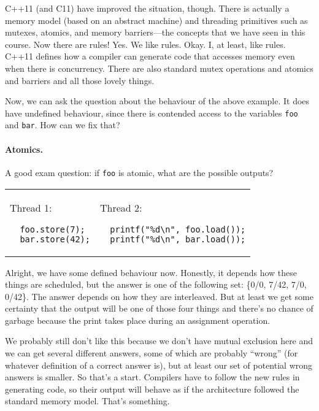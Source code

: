 C++11 (and C11) have improved the situation, though. There is actually
a memory model (based on an abstract machine) and threading primitives
such as mutexes, atomics, and memory barriers---the concepts that we
have seen in this course. Now there are rules! Yes. We like rules. Okay. I, at least, like rules. C++11 defines how a compiler can generate code that accesses memory even when there is concurrency. There are also standard mutex operations and atomics and barriers and all those lovely things.

Now, we can ask the question about the behaviour of the above example.
It does have undefined behaviour, since there is contended access to
the variables {\tt foo} and {\tt bar}. How can we fix that?

\paragraph{Atomics.}
A good exam question: if {\tt foo} is atomic, what are the possible outputs? 
    
    \begin{tabular}{ll}
      \begin{minipage}{.25\textwidth}
        Thread 1:
        \begin{verbatim}
  foo.store(7);
  bar.store(42);
        \end{verbatim}
      \end{minipage} &
      \begin{minipage}{.45\textwidth}
        Thread 2:
        \begin{verbatim}
  printf("%d\n", foo.load());
  printf("%d\n", bar.load());
        \end{verbatim}
      \end{minipage}
    \end{tabular}

Alright, we have some defined behaviour now.  Honestly, it depends how these things are scheduled, but the answer is one of the following set: \{0/0, 7/42, 7/0,  0/42\}. The answer depends on how they are interleaved. But at least we get some certainty that the output will be one of those four things and there's no chance of garbage because the print takes place during an assignment operation. 

We probably still don't like this because we don't have mutual exclusion here and we can get several different answers, some of which are probably ``wrong'' (for whatever definition of a correct answer is), but at least our set of potential wrong answers is smaller. So that's a start. Compilers have to follow the new rules in generating code, so their output will behave as if the architecture followed the standard memory model. That's something. 

